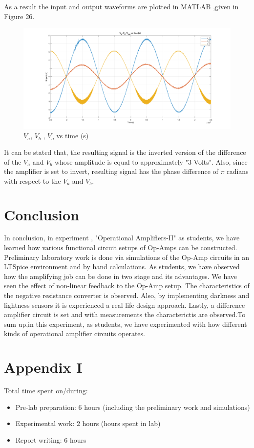 \documentclass[letterpaper,12pt]{article}
\begin{document}
As a result the input and output waveforms are plotted in MATLAB ,given in Figure 26.
\begin{figure}[H]
	\centering
   \includegraphics[width=1\textwidth]{5.png}
   \caption{\(V_{a}\), \(V_{b}\) , \(V_{o}\) vs time (s)}
\end{figure}
It can be stated that, the resulting signal is the inverted version of the difference of the \(V_a\) and \(V_b\) whose amplitude is equal to approximately "3 Volts". Also, since the amplifier is set to invert, resulting signal has the phase difference of \(\pi \) radians with respect to the \(V_a\) and \(V_b\). 
\section{Conclusion}
In conclusion, in experiment , "Operational Amplifiers-II" as students, we have learned how various functional circuit setups of Op-Amps can be constructed. Preliminary laboratory work is done via simulations of the Op-Amp circuits in an LTSpice environment and by hand calculations. As students, we have observed how the amplifying job can be done in two stage and its advantages. We have seen the effect of non-linear feedback to the Op-Amp setup. The characteristics of the negative resistance converter is observed. Also, by implementing darkness and lightness sensors it is experienced a real life design approach. Lastly, a difference amplifier circuit is set and with measurements the characterictis are observed.To sum up,in this experiment, as students, we have experimented with how different kinds of operational amplifier circuits operates. 
\section*{Appendix I}
Total time spent on/during:
\begin{itemize}
	\item Pre-lab preparation: 6 hours (including the preliminary work and simulations) 
	\item Experimental work: 2 hours (hours spent in lab)
	\item Report writing: 6 hours 
\end{itemize}
\end{document}
